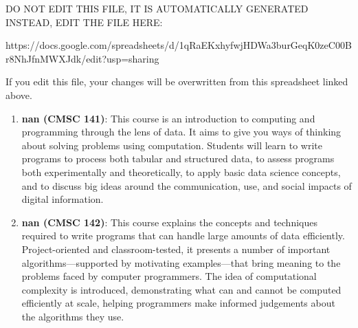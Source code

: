 
DO NOT EDIT THIS FILE, IT IS AUTOMATICALLY GENERATED
INSTEAD, EDIT THE FILE HERE:

https://docs.google.com/spreadsheets/d/1qRaEKxhyfwjHDWa3burGeqK0zeC00Br8NhJfnMWXJdk/edit?usp=sharing

If you edit this file, your changes will be overwritten from this spreadsheet
linked above.

\begin{enumerate}
\item \textbf{nan (CMSC 141)}: This course is an introduction to computing and programming through the lens of data. It aims to give you ways of thinking about solving problems using computation. Students will learn to write programs to process both tabular and structured data, to assess programs both experimentally and theoretically, to apply basic data science concepts, and to discuss big ideas around the communication, use, and social impacts of digital information.
\item \textbf{nan (CMSC 142)}: This course explains the concepts and techniques required to write programs that can handle large amounts of data efficiently. Project-oriented and classroom-tested, it presents a number of important algorithms—supported by motivating examples—that bring meaning to the problems faced by computer programmers. The idea of computational complexity is introduced, demonstrating what can and cannot be computed efficiently at scale, helping programmers make informed judgements about the algorithms they use. 
\end{enumerate}